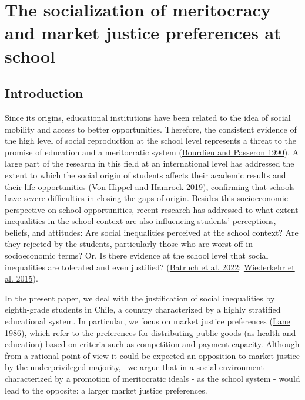 \documentclass[
  letterpaper,
  DIV=11,
  numbers=noendperiod]{scrartcl}
\author{}
\date{}
\begin{document}
\ifdefined\Shaded\renewenvironment{Shaded}{\begin{tcolorbox}[boxrule=0pt, interior hidden, borderline west={3pt}{0pt}{shadecolor}, breakable, enhanced, sharp corners, frame hidden]}{\end{tcolorbox}}\fi

\hypertarget{the-socialization-of-meritocracy-and-market-justice-preferences-at-school}{%
\section{The socialization of meritocracy and market justice preferences
at
school}\label{the-socialization-of-meritocracy-and-market-justice-preferences-at-school}}

\hypertarget{introduction}{%
\subsection{Introduction}\label{introduction}}

Since its origins, educational institutions have been related to the
idea of social mobility and access to better opportunities. Therefore,
the consistent evidence of the high level of social reproduction at the
school level represents a threat to the promise of education and a
meritocratic system
(\protect\hyperlink{ref-bourdieu_reproduction_1990}{Bourdieu and
Passeron 1990}). A large part of the research in this field at an
international level has addressed the extent to which the social origin
of students affects their academic results and their life opportunities
(\protect\hyperlink{ref-vonhippel_test_2019}{Von Hippel and Hamrock
2019}), confirming that schools have severe difficulties in closing the
gaps of origin. Besides this socioeconomic perspective on school
opportunities, recent research has addressed to what extent inequalities
in the school context are also influencing students' perceptions,
beliefs, and attitudes: Are social inequalities perceived at the school
context? Are they rejected by the students, particularly those who are
worst-off in socioeconomic terms? Or, Is there evidence at the school
level that social inequalities are tolerated and even justified?
(\protect\hyperlink{ref-batruch_belief_2022}{Batruch et al. 2022};
\protect\hyperlink{ref-wiederkehr_belief_2015}{Wiederkehr et al.
2015}).~

In the present paper, we deal with the justification of social
inequalities by eighth-grade students in Chile, a country characterized
by a highly stratified educational system. In particular, we focus on
market justice preferences
(\protect\hyperlink{ref-lane_market_1986}{Lane 1986}), which refer to
the preferences for distributing public goods (as health and education)
based on criteria such as competition and payment capacity. Although
from a rational point of view it could be expected an opposition to
market justice by the underprivileged majority,~ we argue that in a
social environment characterized by a promotion of meritocratic ideals -
as the school system - would lead to the opposite: a larger market
justice preferences.~
\end{document}
